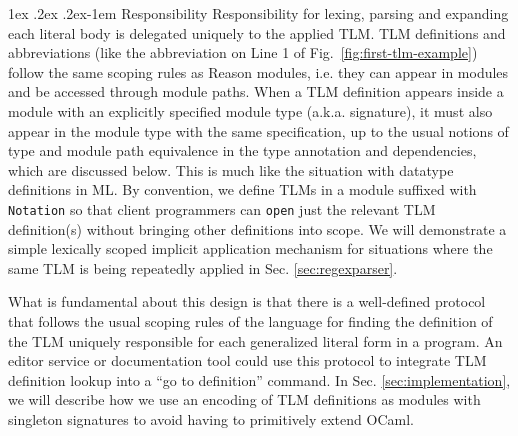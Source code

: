 \documentclass[acmsmall]{acmart}
\makeatletter
\renewcommand{\subsubsection}{%
  \@startsection{subsubsection}{3}%
  {\z@}{1ex \@plus .2ex \@minus .2ex}{-1em}%
  {\normalfont\normalsize\bfseries}%
}
\newcommand{\li}[1]{\lstinline[basicstyle=\ttfamily\fontsize{9pt}{1em}\selectfont]{#1}}
\makeatother
\begin{document}

\subsubsection{Responsibility} 
Responsibility for lexing, parsing and expanding each literal body is delegated uniquely to the applied TLM. %
TLM definitions and abbreviations (like the abbreviation on Line 1 of Fig.~\ref{fig:first-tlm-example}) follow the same scoping rules as Reason modules, i.e. they can appear in modules and be accessed through module paths. When a TLM definition appears inside a module with an explicitly specified module type (a.k.a. signature), it must also appear in the module type with the same specification, up to the usual notions of type and module path equivalence in the type annotation and dependencies, which are discussed below. This is much like the situation with datatype definitions in ML. By convention, we define TLMs in a module suffixed with \li{Notation} so that client programmers can \li{open} just the relevant TLM definition(s) without bringing other definitions into scope. We will demonstrate a simple lexically scoped implicit application mechanism for situations where the same TLM is being repeatedly applied  in Sec. \ref{sec:regexparser}.

What is fundamental about this design is that there is a well-defined protocol that follows the usual scoping rules of the language for finding the definition of the TLM uniquely responsible for each generalized literal form in a program. An editor service or documentation tool could use this protocol to integrate TLM definition lookup into a ``go to definition'' command. In Sec. \ref{sec:implementation}, we will describe how we use an encoding of TLM definitions as modules with singleton signatures to avoid having to primitively extend OCaml.
\end{document}
